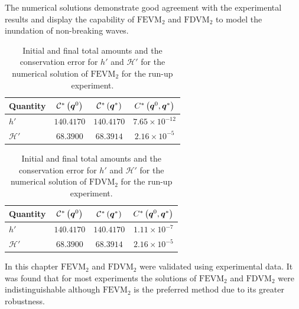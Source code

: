 The numerical solutions demonstrate good agreement with the experimental results and display the capability of $\text{FEVM}_2$ and $\text{FDVM}_2$ to model the inundation of non-breaking waves.

\begin{table}
	\centering
	\begin{tabular}{l  c  c c}
		Quantity& $\mathcal{C}^*\left(\boldsymbol{q}^0\right)$ & $\mathcal{C}^*\left(\boldsymbol{q}^*\right)$ & ${C}^*\left(\boldsymbol{q}^0,\boldsymbol{q}^*\right)$  \B\\
		\hline 
		$h'$ & $140.4170$ & $140.4170$ & $7.65\times 10^{-12}$ \T \\
		$\mathcal{H}'$ & $68.3900$ & $68.3914$ & $2.16 \times 10^{-5}$ \B\\
		\hline
	\end{tabular}
	\caption{Initial and final total amounts and the conservation error for $h'$ and $\mathcal{H}'$ for the numerical solution of $\text{FEVM}_2$ for the run-up experiment.}
	\label{tab:ConservationSynFEVM}
\end{table}
\begin{table}
	\centering
	\begin{tabular}{l  c  c c}
		Quantity& $\mathcal{C}^*\left(\boldsymbol{q}^0\right)$ & $\mathcal{C}^*\left(\boldsymbol{q}^*\right)$ & ${C}^*\left(\boldsymbol{q}^0,\boldsymbol{q}^*\right)$ \B \\
		\hline
		$h'$ & $140.4170$ & $140.4170$ & $1.11\times 10^{-7}$ \T\\
		$\mathcal{H}'$ & $68.3900$ & $68.3914$ & $2.16 \times 10^{-5}$ \B \\
		\hline
	\end{tabular}
	\caption{Initial and final total amounts and the conservation error for $h'$ and $\mathcal{H}'$ for the numerical solution of $\text{FDVM}_2$ for the run-up experiment.}
	\label{tab:ConservationSynFDVM}
\end{table}

\medskip
In this chapter $\text{FEVM}_2$ and $\text{FDVM}_2$ were validated using experimental data. It was found that for most experiments the solutions of $\text{FEVM}_2$ and $\text{FDVM}_2$ were indistinguishable although $\text{FEVM}_2$ is the preferred method due to its greater robustness. 

